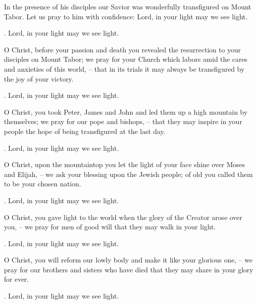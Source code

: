 \lettrine[lines=2]{I}{}n the presence of his disciples our Savior was wonderfully transfigured on Mount Tabor.  Let us pray to him with confidence: Lord, in your light may we see light.
\par \Rbar. Lord, in your light may we see light.

O Christ, before your passion and death you revealed the resurrection to your disciples on Mount Tabor; we pray for your Church which labors amid the cares and anxieties of this world,
– that in its trials it may always be transfigured by the joy of your victory.
\par \Rbar. Lord, in your light may we see light.

O Christ, you took Peter, James and John and led them up a high mountain by themselves; we pray for our pope and bishops,
– that they may inspire in your people the hope of being transfigured at the last day.
\par \Rbar. Lord, in your light may we see light.

O Christ, upon the mountaintop you let the light of your face shine over Moses and Elijah,
– we ask your blessing upon the Jewish people; of old you called them to be your chosen nation.
\par \Rbar. Lord, in your light may we see light.

O Christ, you gave light to the world when the glory of the Creator arose over you,
– we pray for men of good will that they may walk in your light.
\par \Rbar. Lord, in your light may we see light.

O Christ, you will reform our lowly body and make it like your glorious one,
– we pray for our brothers and sisters who have died that they may share in your glory for ever.
\par \Rbar. Lord, in your light may we see light.
